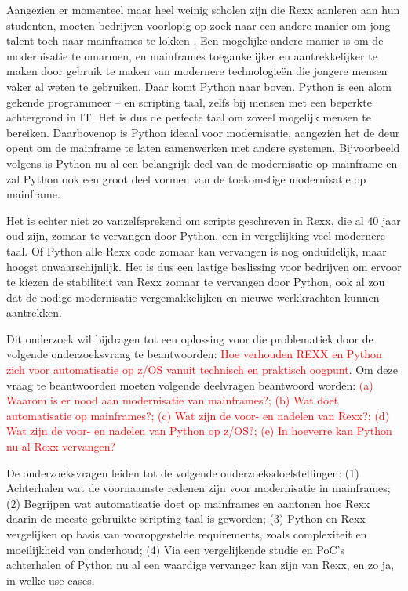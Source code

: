 Aangezien er momenteel maar heel weinig scholen zijn die Rexx aanleren aan hun studenten, moeten bedrijven voorlopig op zoek naar een andere manier om jong talent toch naar mainframes te lokken \autocite{Blondeel2025}. Een mogelijke andere manier is om de modernisatie te omarmen, en mainframes toegankelijker en aantrekkelijker te maken door gebruik te maken van modernere technologieën die jongere mensen vaker al weten te gebruiken. Daar komt Python naar boven. Python is een alom gekende programmeer – en scripting taal, zelfs bij mensen met een beperkte achtergrond in IT. Het is dus de perfecte taal om zoveel mogelijk mensen te bereiken. Daarbovenop is Python ideaal voor modernisatie, aangezien het de deur opent om de mainframe te laten samenwerken met andere systemen. Bijvoorbeeld volgens \textcite{Gilio2021} is Python nu al een belangrijk deel van de modernisatie op mainframe en zal Python ook een groot deel vormen van de toekomstige modernisatie op mainframe. 

Het is echter niet zo vanzelfsprekend om scripts geschreven in Rexx, die al 40 jaar oud zijn, zomaar te vervangen door Python, een in vergelijking veel modernere taal. Of Python alle Rexx code zomaar kan vervangen is nog onduidelijk, maar hoogst onwaarschijnlijk. Het is dus een lastige beslissing voor bedrijven om ervoor te kiezen de stabiliteit van Rexx zomaar te vervangen door Python, ook al zou dat de nodige modernisatie vergemakkelijken en nieuwe werkkrachten kunnen aantrekken.

Dit onderzoek wil bijdragen tot een oplossing voor die problematiek door de volgende onderzoeksvraag te beantwoorden: \textcolor{red} {Hoe verhouden REXX en Python zich voor automatisatie op z/OS vanuit technisch en praktisch oogpunt}. Om deze vraag te beantwoorden moeten volgende deelvragen beantwoord worden: \textcolor{red} {(a) Waarom is er nood aan modernisatie van mainframes?; (b) Wat doet automatisatie op mainframes?; (c) Wat zijn de voor- en nadelen van Rexx?; (d) Wat zijn de voor- en nadelen van Python op z/OS?; (e) In hoeverre kan Python nu al Rexx vervangen?}

De onderzoeksvragen leiden tot de volgende onderzoeksdoelstellingen: (1) Achterhalen wat de voornaamste redenen zijn voor modernisatie in mainframes; (2) Begrijpen wat automatisatie doet op mainframes en aantonen hoe Rexx daarin de meeste gebruikte scripting taal is geworden; (3) Python en Rexx vergelijken op basis van vooropgestelde requirements, zoals complexiteit en moeilijkheid van onderhoud; (4) Via een vergelijkende studie en PoC's achterhalen of Python nu al een waardige vervanger kan zijn van Rexx, en zo ja, in welke use cases.


